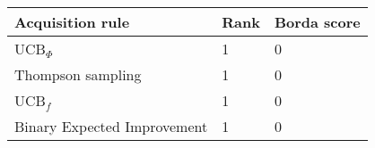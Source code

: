 \begin{tabular}{lll}
Acquisition rule & Rank & Borda score \\ 
\hline 
UCB$_\Phi$                                    & 1 & 0 \\ 
Thompson sampling                             & 1 & 0 \\ 
UCB$_f$ \citep{Tesch2013}                     & 1 & 0 \\ 
Binary Expected Improvement \citep{Tesch2013} & 1 & 0 \\ 
\hline 
\end{tabular}